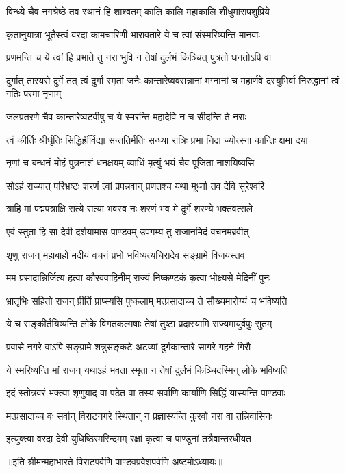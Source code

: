 \twolineshloka
{विन्ध्ये चैव नगश्रेष्ठे तव स्थानं हि शाश्वतम्}
{कालि कालि महाकालि शीधुमांसपशुप्रिये}%

\twolineshloka
{कृतानुयात्रा भूतैस्त्वं वरदा कामचारिणी}
{भारावतारे ये च त्वां संस्मरिष्यन्ति मानवाः}%

\twolineshloka
{प्रणमन्ति च ये त्वां हि प्रभाते तु नरा भुवि}
{न तेषां दुर्लभं किञ्चित् पुत्रतो धनतोऽपि वा}%

\threelineshloka
{दुर्गात् तारयसे दुर्गे तत् त्वं दुर्गा स्मृता जनैः}
{कान्तारेष्ववसन्नानां मग्नानां च महार्णवे}
{दस्युभिर्वा निरुद्धानां त्वं गतिः परमा नृणाम्}%

\twolineshloka
{जलप्रतरणे चैव कान्तारेष्वटवीषु च}
{ये स्मरन्ति महादेवि न च सीदन्ति ते नराः}%

\twolineshloka
{त्वं कीर्तिः श्रीर्धृतिः सिद्धिर्ह्रीर्विद्या सन्ततिर्मतिः}
{सन्ध्या रात्रिः प्रभा निद्रा ज्योत्स्ना कान्तिः क्षमा दया}%

\twolineshloka
{नृणां च बन्धनं मोहं पुत्रनाशं धनक्षयम्}
{व्याधिं मृत्युं भयं चैव पूजिता नाशयिष्यसि}%

\twolineshloka
{सोऽहं राज्यात् परिभ्रष्टः शरणं त्वां प्रपन्नवान्}
{प्रणतश्च यथा मूर्ध्ना तव देवि सुरेश्वरि}%

\twolineshloka
{त्राहि मां पद्मपत्राक्षि सत्ये सत्या भवस्व नः}
{शरणं भव मे दुर्गे शरण्ये भक्तवत्सले}%

\twolineshloka
{एवं स्तुता हि सा देवी दर्शयामास पाण्डवम्}
{उपगम्य तु राजानमिदं वचनमब्रवीत्}%


\twolineshloka
{शृणु राजन् महाबाहो मदीयं वचनं प्रभो}
{भविष्यत्यचिरादेव सङ्ग्रामे विजयस्तव}%

\twolineshloka
{मम प्रसादान्निर्जित्य हत्वा कौरववाहिनीम्}
{राज्यं निष्कण्टकं कृत्वा भोक्ष्यसे मेदिनीं पुनः}%

\twolineshloka
{भ्रातृभिः सहितो राजन् प्रीतिं प्राप्स्यसि पुष्कलाम्}
{मत्प्रसादाच्च ते सौख्यमारोग्यं च भविष्यति}%

\twolineshloka
{ये च सङ्कीर्तयिष्यन्ति लोके विगतकल्मषाः}
{तेषां तुष्टा प्रदास्यामि राज्यमायुर्वपुः सुतम्}%

\twolineshloka
{प्रवासे नगरे वाऽपि सङ्ग्रामे शत्रुसङ्कटे}
{अटव्यां दुर्गकान्तारे सागरे गहने गिरौ}%

\twolineshloka
{ये स्मरिष्यन्ति मां राजन् यथाऽहं भवता स्मृता}
{न तेषां दुर्लभं किञ्चिदस्मिन् लोके भविष्यति}%

\twolineshloka
{इदं स्तोत्रवरं भक्त्या शृणुयाद् वा पठेत वा}
{तस्य सर्वाणि कार्याणि सिद्धिं यास्यन्ति पाण्डवाः}%

\twolineshloka
{मत्प्रसादाच्च वः सर्वान् विराटनगरे स्थितान्}
{न प्रज्ञास्यन्ति कुरवो नरा वा तन्निवासिनः}%

\twolineshloka
{इत्युक्त्वा वरदा देवी युधिष्ठिरमरिन्दमम्}
{रक्षां कृत्वा च पाण्डूनां तत्रैवान्तरधीयत}%

॥इति श्रीमन्महाभारते विराटपर्वणि पाण्डवप्रवेशपर्वणि अष्टमोऽध्यायः॥